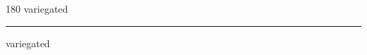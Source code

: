 
\begin{frame}
\begin{center}
\begin{turn}{180}
{\fontsize{2.5cm}{1em}\selectfont variegated}
\end{turn}
\vspace{1em}\par  
\hrule
\vspace{1em}\par  
{\fontsize{2.5cm}{1em}\selectfont variegated}
\end{center}
\end{frame}
